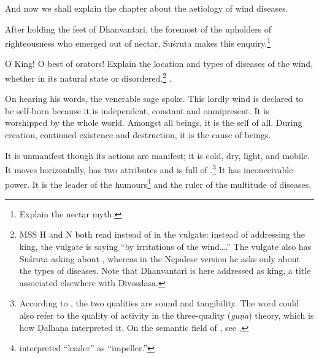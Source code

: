 \begin{translation}

\item [1] And now we shall explain the chapter about the aetiology of 
wind diseases.



\item[3] After holding the feet of Dhanvantari, the foremost of the upholders of 
righteousness who emerged out of nectar, Suśruta makes this 
enquiry.\footnote{Explain the nectar myth.}

\item[4] 

O King! O best of orators! Explain the location and types of diseases
of the wind, whether in its natural state or disordered.\footnote{MSS H and N 
both read  instead of  in the vulgate:  instead of 
addressing the king, the vulgate is saying “by irritations of the wind\ldots.”  
The vulgate also has Suśruta asking about , whereas in the 
Nepalese version he asks only about the types of diseases. Note that 
Dhanvantari is here addressed as king, a title associated elsewhere with 
Divosdāsa.}
.

\item[5--9] On hearing his words, the venerable sage spoke.  This
lordly wind is declared to be self-born because it is independent,
constant and omnipresent. It is worshipped by the whole world.  
Amongst all beings, it is the self of all. During creation, continued existence 
and destruction, it is the cause of beings. 

It is unmanifest though its actions are manifest; it is cold, dry,
light, and mobile.  It moves horizontally, has two attributes and is
full of .\footnote{According to ,
    the two qualities are sound and tangibility.  The word 
    could also refer to the quality of activity in the three-quality
    (\emph{guṇa}) theory, which is how Ḍalhaṇa interpreted it.  On the
    semantic field of , see \cite[14 note 26 and
    ff.]{das-2003}.} %
    It has inconceivable power. It is the leader of the
    humours\footnote{ interpreted  “leader”
        as  “impeller.”} and the ruler of the multitude of
        diseases.
    

\end{translation}
